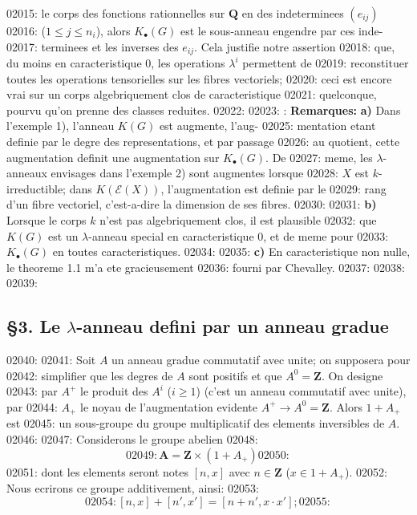 02015: le corps des fonctions rationnelles sur $\mathbf{Q}$ en des indeterminees $(e_{ij})$
02016: ($1 \leq j \leq n_i$), alors $K_{\bullet}(G)$ est le sous-anneau engendre par ces inde-
02017: terminees et les inverses des $e_{ij}$. Cela justifie notre assertion
02018: que, du moins en caracteristique 0, les operations $\lambda^i$ permettent de
02019: reconstituer toutes les operations tensorielles sur les fibres vectoriels;
02020: ceci est encore vrai sur un corps algebriquement clos de caracteristique
02021: quelconque, pourvu qu'on prenne des classes reduites.
02022: 
02023: : \textbf{Remarques:} \textbf{a)} Dans l'exemple 1), l'anneau $K(G)$ est augmente, l'aug-
02025: mentation etant definie par le degre des representations, et par passage
02026: au quotient, cette augmentation definit une augmentation sur $K_{\bullet}(G)$. De
02027: meme, les $\lambda$-anneaux envisages dans l'exemple 2) sont augmentes lorsque
02028: $X$ est $k$-irreductible; dans $K(\mathcal{E}(X))$, l'augmentation est definie par le
02029: rang d'un fibre vectoriel, c'est-a-dire la dimension de ses fibres.
02030: 
02031: \textbf{b)} Lorsque le corps $k$ n'est pas algebriquement clos, il est plausible
02032: que $K(G)$ est un $\lambda$-anneau special en caracteristique 0, et de meme pour
02033: $K_{\bullet}(G)$ en toutes caracteristiques.
02034: 
02035: \textbf{c)} En caracteristique non nulle, le theoreme 1.1 m'a ete gracieusement
02036: fourni par Chevalley.
02037: 
02038: 
02039: \subsection*{\S 3. Le $\lambda$-anneau defini par un anneau gradue}
02040: 
02041: Soit $A$ un anneau gradue commutatif avec unite; on supposera pour
02042: simplifier que les degres de $A$ sont positifs et que $A^0 = \mathbf{Z}$. On designe
02043: par $A^{+}$ le produit des $A^i$ ($i \geq 1$) (c'est un anneau commutatif avec unite), par
02044: $A_{+}$ le noyau de l'augmentation evidente $A^{+} \to A^0 = \mathbf{Z}$. Alors $1 + A_{+}$ est
02045: un sous-groupe du groupe multiplicatif des elements inversibles de $A$.
02046: 
02047: Considerons le groupe abelien
02048: \begin{equation}
02049: \mathbf{A} = \mathbf{Z} \times (1 + A_{+})
02050: \end{equation}
02051: dont les elements seront notes $[n, x]$ avec $n \in \mathbf{Z}$ ($x \in 1 + A_{+}$).
02052: Nous ecrirons ce groupe additivement, ainsi:
02053: \begin{equation}
02054: [n, x] + [n', x'] = [n + n', x \cdot x'];
02055: \end{equation}
